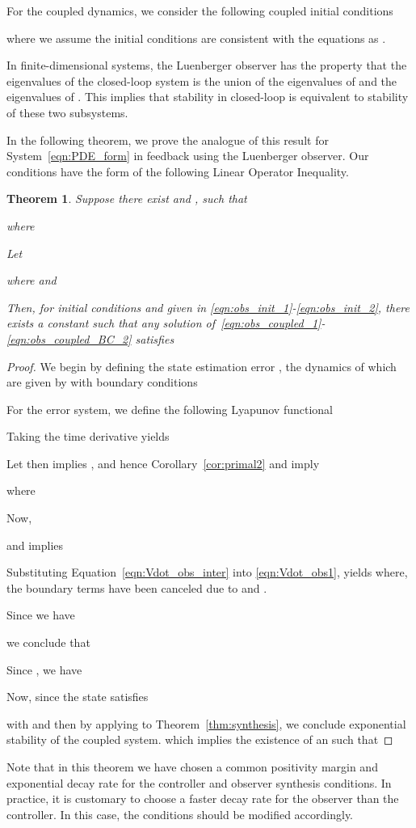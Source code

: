 \documentclass[9pt,journal,twocolumn]{IEEEtran}
\newtheorem{theorem}{Theorem}
\begin{document}
For the coupled dynamics, we consider the following coupled initial conditions

where we assume the initial conditions are consistent with the equations as .


In finite-dimensional systems, the Luenberger observer has the property that the eigenvalues of the closed-loop system is the union of the eigenvalues of  and the eigenvalues of . This implies that stability in closed-loop is equivalent to stability of these two subsystems.

In the following theorem, we prove the analogue of this result for System~\eqref{eqn:PDE_form} in feedback using the Luenberger observer. Our conditions have the form of the following Linear Operator Inequality.


\begin{theorem}\label{observer_synth_colloc}
Suppose there exist
 and ,
such that

where


Let
 
where
 and

Then, for initial conditions  and  given in \eqref{eqn:obs_init_1}-\eqref{eqn:obs_init_2}, there exists a constant  such that any solution  of~\eqref{eqn:obs_coupled_1}-\eqref{eqn:obs_coupled_BC_2} satisfies


\end{theorem}

\begin{proof}
We begin by defining the state estimation error , the dynamics of which are given by
  with boundary conditions

For the error system, we define the following Lyapunov functional

Taking the time derivative yields
 
Let  then  implies , and hence Corollary~\ref{cor:primal2} and  imply
 
 where

Now,
 
and   implies

  Substituting Equation~\eqref{eqn:Vdot_obs_inter} into \eqref{eqn:Vdot_obs1}, yields
 where, the boundary terms have been canceled due to  and .

Since we have

we conclude that

Since , we have
 
Now, since the state satisfies

with   and  then by applying  to Theorem~\ref{thm:synthesis}, we conclude exponential stability of the coupled system. which implies the existence of an  such that

\end{proof}
 Note that in this theorem we have chosen a common positivity margin  and exponential decay rate  for the controller and observer synthesis conditions. In practice, it is customary to choose a faster decay rate for the observer than the controller. In this case, the conditions should be modified accordingly.
\end{document}
